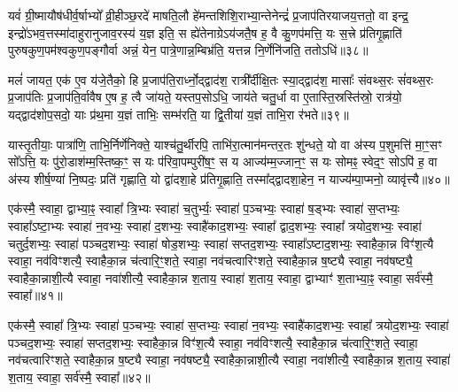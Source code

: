 यवं॑ ग्री॒ष्मायौष॑धीर्व॒र्\mbox{}षाभ्यो᳚ व्री॒हीञ्छ॒रदे॑ माषति॒लौ हे॑मन्तशिशि॒राभ्या॒न्तेनेन्द्रं॑ प्र॒जाप॑तिरयाजय॒त्ततो॒ वा इन्द्र॒ इन्द्रो॑\-ऽभव॒त्तस्मा॑दाहुरानुजाव॒रस्य॑ य॒ज्ञ इति॒ स ह्ये॑तेनाग्रे\-ऽय॑जतै॒ष ह॒ वै कु॒णप॑मत्ति॒ यः स॒त्त्रे प्र॑तिगृ॒ह्णाति॑ पुरुषकुण॒पम॑श्वकुण॒पङ्गौर्वा अन्नं॒ येन॒ पात्रे॒णान्न॒म्बिभ्र॑ति॒ यत्तन्न नि॒र्णेनि॑जति॒ ततो\-ऽधि॑॥३८॥

मलं॑ जायत॒ एक॑ ए॒व य॑जे॒तैको॒ हि प्र॒जाप॑ति॒रार्ध्नो॒द्द्वाद॑श॒ रात्री᳚र्दीक्षि॒तः स्या॒द्द्वाद॑श॒ मासाः᳚ संवथ्स॒रः सं॑वथ्स॒रः प्र॒जाप॑तिः प्र॒जाप॑ति॒र्वावैष ए॒ष ह॒ त्वै जा॑यते॒ यस्तप॒सो\-ऽधि॒ जाय॑ते चतु॒र्धा वा ए॒तास्ति॒स्रस्ति॑स्रो॒ रात्र॑यो॒ यद्द्वाद॑शोप॒सदो॒ याः प्र॑थ॒मा य॒ज्ञं ताभिः॒ सम्भ॑रति॒ या द्वि॒तीया॑ य॒ज्ञं ताभि॒रा र॑भते॥३९॥

यास्तृ॒तीयाः॒ पात्रा॑णि॒ ताभि॒र्निर्णे॑निक्ते॒ याश्च॑तु॒र्थीरपि॒ ताभि॑रा॒त्मान॑मन्तर॒तः शु॑न्धते॒ यो वा अ॑स्य प॒शुमत्ति॑ मा॒ꣳ॒सꣳ सो᳚\-ऽत्ति॒ यः पु॑रो॒डाश॑म्म॒स्तिष्क॒ꣳ॒ स यः प॑रिवा॒पम्पुरी॑ष॒ꣳ॒ स य आज्य॑म्म॒ज्जान॒ꣳ॒ स यः सोमꣴ॒ स्वेद॒ꣳ॒ सो\-ऽपि॑ ह॒ वा अ॑स्य शीर्\mbox{}ष॒ण्या॑ नि॒ष्पदः॒ प्रति॑ गृह्णाति॒ यो द्वा॑दशा॒हे प्र॑तिगृ॒ह्णाति॒ तस्मा᳚द्द्वादशा॒हेन॒ न याज्य॑म्पा॒प्मनो॒ व्यावृ॑त्त्यै॥४०॥

{\anuvakamend[{अय॑च्छ॒दधि॑ रभते द्वादशा॒हेन॑ च॒त्वारि॑ च॥10॥}]}

एक॑स्मै॒ स्वाहा॒ द्वाभ्या॒ꣴ॒ स्वाहा᳚ त्रि॒भ्यः स्वाहा॑ च॒तुर्भ्यः॒ स्वाहा॑ प॒ञ्चभ्यः॒ स्वाहा॑ ष॒ड्भ्यः स्वाहा॑ स॒प्तभ्यः॒ स्वाहा᳚\-ऽष्टा॒भ्यः स्वाहा॑ न॒वभ्यः॒ स्वाहा॑ द॒शभ्यः॒ स्वाहै॑काद॒शभ्यः॒ स्वाहा᳚ द्वाद॒शभ्यः॒ स्वाहा᳚ त्रयोद॒शभ्यः॒ स्वाहा॑ चतुर्द॒शभ्यः॒ स्वाहा॑ पञ्चद॒शभ्यः॒ स्वाहा॑ षोड॒शभ्यः॒ स्वाहा॑ सप्तद॒शभ्यः॒ स्वाहा᳚\-ऽष्टाद॒शभ्यः॒ स्वाहैका॒न्न विꣳ॑श॒त्यै स्वाहा॒ नव॑विꣳशत्यै॒ स्वाहैका॒न्न च॑त्वारि॒ꣳ॒शते॒ स्वाहा॒ नव॑चत्वारिꣳशते॒ स्वाहैका॒न्न ष॒ष्ट्यै स्वाहा॒ नव॑षष्ट्यै॒ स्वाहैका॒न्नाशी॒त्यै स्वाहा॒ नवा॑शीत्यै॒ स्वाहैका॒न्न श॒ताय॒ स्वाहा॑ श॒ताय॒ स्वाहा॒ द्वाभ्याꣳ॑ श॒ताभ्या॒ꣴ॒ स्वाहा॒ सर्व॑स्मै॒ स्वाहा᳚॥४१॥

{}

एक॑स्मै॒ स्वाहा᳚ त्रि॒भ्यः स्वाहा॑ प॒ञ्चभ्यः॒ स्वाहा॑ स॒प्तभ्यः॒ स्वाहा॑ न॒वभ्यः॒ स्वाहै॑काद॒शभ्यः॒ स्वाहा᳚ त्रयोद॒शभ्यः॒ स्वाहा॑ पञ्चद॒शभ्यः॒ स्वाहा॑ सप्तद॒शभ्यः॒ स्वाहैका॒न्न विꣳ॑श॒त्यै स्वाहा॒ नव॑विꣳशत्यै॒ स्वाहैका॒न्न च॑त्वारि॒ꣳ॒शते॒ स्वाहा॒ नव॑चत्वारिꣳशते॒ स्वाहैका॒न्न ष॒ष्ट्यै स्वाहा॒ नव॑षष्ट्यै॒ स्वाहैका॒न्नाशी॒त्यै स्वाहा॒ नवा॑शीत्यै॒ स्वाहैका॒न्न श॒ताय॒ स्वाहा॑ श॒ताय॒ स्वाहा॒ सर्व॑स्मै॒ स्वाहा᳚॥४२॥


